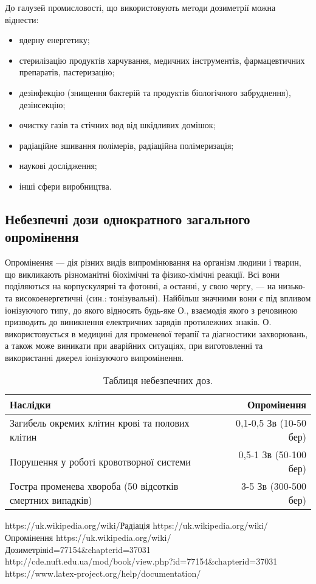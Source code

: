 \documentclass{article}
\begin{document}
\begin{enumerate}
\begin{itemize}
    \newline До галузей промисловості, що використовують методи дозиметрії можна віднести:
    \begin{itemize}
        \item ядерну енергетику;
        \item стерилізацію продуктів харчування, медичних інструментів, фармацевтичних препаратів, пастеризацію;
        \item дезінфекцію (знищення бактерій та продуктів біологічного забруднення), дезінсекцію;
        \item очистку газів та стічних вод від шкідливих домішок;
        \item радіаційне зшивання полімерів, радіаційна полімеризація;
        \item наукові дослідження;
        \item інші сфери виробництва.
    \end{itemize}
    \end{itemize}
\end{enumerate}

\subsection{Небезпечні дози однократного загального опромінення}

Опромінення — дія різних видів випромінювання на організм людини і тварин, що викликають різноманітні біохімічні та фізико-хімічні реакції. Всі вони поділяються на корпускулярні та фотонні, а останні, у свою чергу, — на низько- та високоенергетичні (син.: тонізувальні). Найбільш значними вони є під впливом іонізуючого типу, до якого відносять будь-яке О., взаємодія якого з речовиною призводить до виникнення електричних зарядів протилежних знаків. О. використовується в медицині для променевої терапії та діагностики захворювань, а також може виникати при аварійних ситуаціях, при виготовленні та використанні джерел іонізуючого випромінення.

\begin{table}[htb]
\centering
\begin{tabular}{l|r}
Наслідки & Опромінення \\\hline
Загибель окремих клітин крові та полових клітин & 0,1-0,5 Зв (10-50 бер) \\
Порушення у роботі кровотворної системи & 0,5-1 Зв (50-100 бер)\\
Гостра променева хвороба (50 відсотків смертних випадків) & 3-5 Зв (300-500 бер)\\
\end{tabular}
\caption{\label{tab:widgets}Таблиця небезпечних доз.}
\end{table}

\begin{thebibliography}{3}
 https://uk.wikipedia.org/wiki/Радіація
 https://uk.wikipedia.org/wiki/Опромінення
 https://uk.wikipedia.org/wiki/Дозиметріяid=77154&chapterid=37031
 http://cde.nuft.edu.ua/mod/book/view.php?id=77154&chapterid=37031
 https://www.latex-project.org/help/documentation/
\end{thebibliography}
\end{document}
